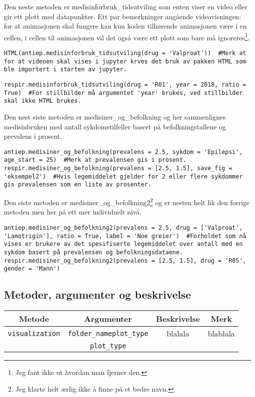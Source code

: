 \documentclass[12pt,norsk,a4paper,fleqn]{article}
\numberwithin{equation}{section}
\begin{document}
Den neste metoden er {\color{blue}medisinforbruk\_tidsutviling} som enten viser en video eller gir ett plott med datapunkter. Ett par bemerkninger angående videovisningen: for at animasjonen skal fungere kan kun koden tilhørende animasjonen være i en cellen, i cellen til animasjonen vil det også være ett plott som bare må ignoreres\footnote{Jeg fant ikke ut hvordan man fjerner den.}.
\begin{lstlisting}
HTML(antiep.medisinforbruk_tidsutviling(drug = 'Valproat'))  #Merk at for at videoen skal vises i jupyter krves det bruk av pakken HTML som ble importert i starten av jupyter.
\end{lstlisting}
\begin{lstlisting}
respir.medisinforbruk_tidsutviling(drug = 'R01', year = 2018, ratio = True)  #For stillbilder må argumentet 'year' brukes, ved stillbilder skal ikke HTML brukes.
\end{lstlisting}
Den nest siste metoden er {\color{blue}medisiner\_og\_befolkning} og her sammenlignes medisinbruken med antall sykdomstilfeller basert på befolkningstallene og prevalens i prosent.
\begin{lstlisting}
antiep.medisiner_og_befolkning(prevalens = 2.5, sykdom = 'Epilepsi', age_start = 25)  #Merk at prevalensen gis i prosent.
respir.medisiner_og_befolkning(prevalens = [2.5, 1.5], save_fig = 'eksempel2')  #Hvis legemiddelet gjelder for 2 eller flere sykdommer gis prevalensen som en liste av prosenter.
\end{lstlisting}
Den siste metoden er {\color{blue}medisiner\_og\_befolkning2}\footnote{Jeg klarte helt ærlig ikke å finne på et bedre navn.} og er nesten helt lik den forrige metoden men her på ett mer individuelt nivå.
\begin{lstlisting}
antiep.medisiner_og_befolkning2(prevalens = 2.5, drug = ['Valproat', 'Lamotrigin'], ratio = True, label = 'Noe greier')  #Forholdet som nå vises er brukere av det spesifiserte legemiddelet over antall med en sykdom basert på prevalensen og befolkningsdataene.
respir.medisiner_og_befolkning2(prevalens = [2.5, 1.5], drug = 'R05', gender = 'Mann')
\end{lstlisting}

\subsection{Metoder, argumenter og beskrivelse}


\begin{table}[H]
\begin{tabular}{c|c|c|c}
Metode & Argumenter & Beskrivelse & Merk\\ \hline
\texttt{\color{green}visualization} & \texttt{\color{red}folder\_name}\texttt{\color{red}plot\_type} & blalala & blablala\\
 & \texttt{\color{red}plot\_type} &  & \\ \hline
\end{tabular}
\end{table}




 
\end{document}
